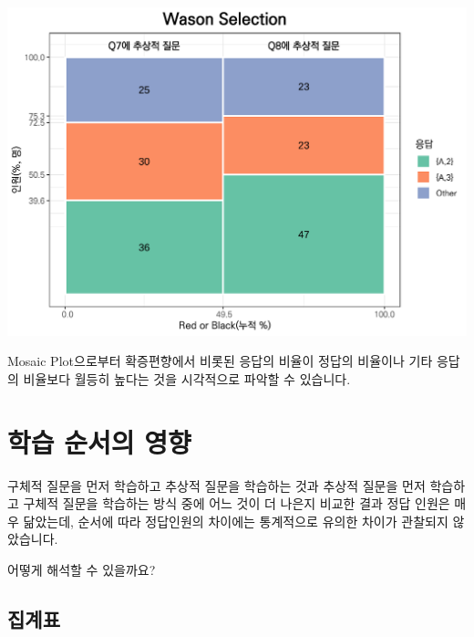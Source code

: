 \documentclass[
]{book}
\begin{document}
\includegraphics{_main_files/figure-latex/unnamed-chunk-201-1.pdf}

Mosaic Plot으로부터 확증편향에서 비롯된 응답의 비율이 정답의 비율이나 기타 응답의 비율보다 월등히 높다는 것을 시각적으로 파악할 수 있습니다.

\section{학습 순서의 영향}\label{uxd559uxc2b5-uxc21cuxc11cuxc758-uxc601uxd5a5}

구체적 질문을 먼저 학습하고 추상적 질문을 학습하는 것과 추상적 질문을 먼저 학습하고 구체적 질문을 학습하는 방식 중에 어느 것이 더 나은지 비교한 결과 정답 인원은 매우 닮았는데, 순서에 따라 정답인원의 차이에는 통계적으로 유의한 차이가 관찰되지 않았습니다.

어떻게 해석할 수 있을까요?

\subsection{집계표}\label{uxc9d1uxacc4uxd45c-2}
\end{document}
